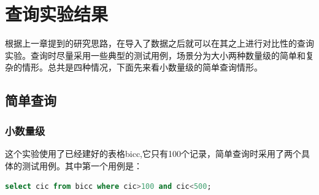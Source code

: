 \chapter{查询实验结果}
  根据上一章提到的研究思路，在导入了数据之后就可以在其之上进行对比性的查询实验。查询时尽量采用一些典型的测试用例，场景分为大小两种数量级的简单和复杂的情形。总共是四种情况，下面先来看小数量级的简单查询情形。

\section{简单查询}
\subsection{小数量级}

  这个实验使用了已经建好的表格bicc,它只有100个记录，简单查询时采用了两个具体的测试用例。其中第一个用例是：

\begin{lstlisting}[language=SQL]
select cic from bicc where cic>100 and cic<500;
\end{lstlisting}

